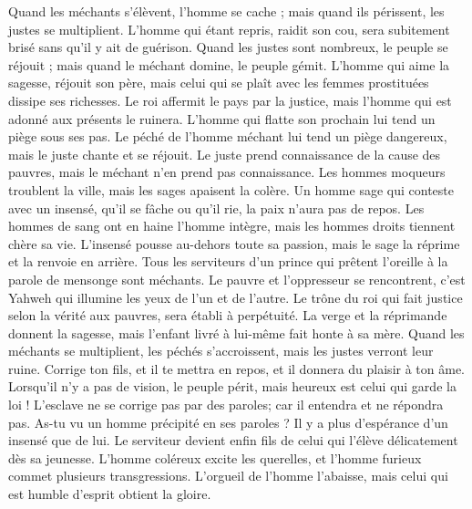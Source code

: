 \begin{multicols}{2}
Quand les méchants s'élèvent, l'homme se cache ; mais quand ils périssent, les justes se multiplient.
\VerseOne{}L'homme qui étant repris, raidit son cou, sera subitement brisé sans qu'il y ait de guérison.
Quand les justes sont nombreux, le peuple se réjouit ; mais quand le méchant domine, le peuple gémit.
L'homme qui aime la sagesse, réjouit son père, mais celui qui se plaît avec les femmes prostituées dissipe ses richesses.
Le roi affermit le pays par la justice, mais l'homme qui est adonné aux présents le ruinera.
L'homme qui flatte son prochain lui tend un piège sous ses pas.
Le péché de l'homme méchant lui tend un piège dangereux, mais le juste chante et se réjouit.
Le juste prend connaissance de la cause des pauvres, mais le méchant n'en prend pas connaissance.
Les hommes moqueurs troublent la ville, mais les sages apaisent la colère.
Un homme sage qui conteste avec un insensé, qu'il se fâche ou qu'il rie, la paix n'aura pas de repos.
Les hommes de sang ont en haine l'homme intègre, mais les hommes droits tiennent chère sa vie.
L'insensé pousse au-dehors toute sa passion, mais le sage la réprime et la renvoie en arrière.
Tous les serviteurs d'un prince qui prêtent l'oreille à la parole de mensonge sont méchants.
Le pauvre et l'oppresseur se rencontrent, c'est Yahweh qui illumine les yeux de l'un et de l'autre.
Le trône du roi qui fait justice selon la vérité aux pauvres, sera établi à perpétuité.
La verge et la réprimande donnent la sagesse, mais l'enfant livré à lui-même fait honte à sa mère.
Quand les méchants se multiplient, les péchés s'accroissent, mais les justes verront leur ruine.
Corrige ton fils, et il te mettra en repos, et il donnera du plaisir à ton âme.
Lorsqu'il n'y a pas de vision, le peuple périt, mais heureux est celui qui garde la loi !
L'esclave ne se corrige pas par des paroles; car il entendra et ne répondra pas.
As-tu vu un homme précipité en ses paroles ? Il y a plus d'espérance  d'un insensé que de lui.
Le serviteur devient enfin fils de celui qui l'élève délicatement dès sa jeunesse. 
L'homme coléreux excite les querelles, et l'homme furieux commet plusieurs transgressions.
L'orgueil de l'homme l'abaisse, mais celui qui est humble d'esprit obtient la gloire.

\end{multicols}
